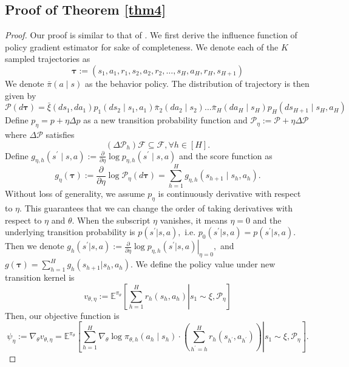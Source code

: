 \documentclass{article}
\numberwithin{equation}{section}
\begin{document}
\subsection{Proof of Theorem \ref{thm4}}
\label{pfthm4}
\begin{proof}
Our proof is similar to that of \cite{bootstrap}. We first derive the influence function of policy gradient estimator for sake of completeness. We denote each of the $K$ sampled trajectories as
$$
\boldsymbol{\tau}:=\left(s_{1}, a_{1}, r_{1}, s_{2}, a_{2}, r_{2}, \ldots, s_{H}, a_{H}, r_{H}, s_{H+1}\right)
$$
We denote $\bar{\pi}(a \mid s)$ as the behavior policy. The distribution of trajectory is then given by
$$
\mathcal{P}(d \boldsymbol{\tau})= \bar{\xi}\left(d s_{1}, d a_{1}\right) p_1\left(d s_{2} \mid s_{1}, a_{1}\right) \bar{\pi}_2\left(d a_{2} \mid s_{2}\right) \ldots \bar{\pi}_H\left(d a_{H} \mid s_{H}\right) p_H\left(d s_{H+1} \mid s_{H}, a_{H}\right)
$$
Define $p_{\eta} = p + \eta\Delta p$ as a new transition probability function and $\mathcal{P}_{\eta}:=\mathcal{P}+\eta \Delta\mathcal{P}$ where $\Delta \mathcal{P}$ satisfies
$$(\Delta \mathcal{P}_h) \mathcal{F} \subseteq \mathcal{F},\forall h\in[H].$$ 
Define $g_{\eta,h}\left(s^{\prime} \mid s, a\right):=\frac{\partial}{\partial \eta} \log p_{\eta,h}\left( s^{\prime} \mid s, a\right)$ and the score function as 
$$
g_{\eta}(\boldsymbol{\tau}):=\frac{\partial}{\partial \eta} \log \mathcal{P}_{\eta}(d \boldsymbol{\tau})=\sum_{h=1}^{H} g_{\eta,h}\left(s_{h+1} \mid s_{h}, a_{h}\right).
$$
Without loss of generality, we assume $p_{\eta}$ is continuously derivative with respect to $\eta.$ This guarantees that we can change the order of taking derivatives with respect to $\eta$ and $\theta.$ When the subscript $\eta$ vanishes, it means $\eta = 0$ and the underlying transition probability is $p(s^{\prime}|s,a),$ i.e. $p_0(s^{\prime} |s,a) = p(s^{\prime} |s,a).$ Then we denote $g_h(s^{\prime}|s,a) := \left.\frac{\partial}{\partial \eta}\log p_{\eta,h}(s^{\prime}|s,a)\right|_{\eta = 0},$ and $g(\boldsymbol{\tau}) = \sum_{h=1}^H g_h(s_{h+1}|s_h,a_h).$ We define the policy value under new transition kernel is
\begin{equation*}
    v_{\theta,\eta} := \mathbb{E}^{\pi_{\theta}} \left[\left.\sum_{h=1}^H r_h(s_h,a_h) \right| s_1 \sim \xi, \mathcal{P}_{\eta}\right]
\end{equation*}
Then, our objective function is
$$
\psi_{\eta} := \nabla_{\theta} v_{\theta,\eta} =\mathbb{E}^{\pi_{\theta}}\left[\left.\sum_{h=1}^{H} \nabla_{\theta} \log \pi_{\theta,h}\left(a_{h} \mid s_{h}\right) \cdot\left(\sum_{h^{\prime}=h}^{H} r_h\left(s_{h^{\prime}}, a_{h^{\prime}}\right)\right) \right| s_{1} \sim \xi, \mathcal{P}_{\eta}\right].
$$
\end{proof}
\end{document}
